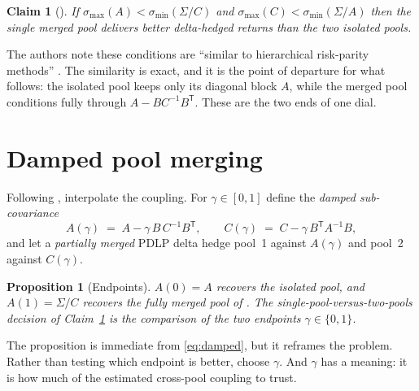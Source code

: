 \documentclass[11pt]{article}
\newtheorem{claim}{Claim}
\newtheorem{proposition}{Proposition}
\theoremstyle{definition}
\newcommand{\Sig}{\Sigma}
\newcommand{\T}{^{\mathsf{T}}}
\newcommand{\smin}{\sigma_{\min}}
\newcommand{\smax}{\sigma_{\max}}
\begin{document}
\begin{claim}[{\citealp[Claim~B.1]{chitra2025}}]
\label{claim:b1}
If $\smax(A) < \smin(\Sig/C)$ and $\smax(C)<\smin(\Sig/A)$ then the single
merged pool delivers better delta-hedged returns than the two isolated pools.
\end{claim}

The authors note these conditions are ``similar to hierarchical risk-parity
methods'' \citep{cotton2024,deprado2016}. The similarity is exact, and it is the
point of departure for what follows: the isolated pool keeps only its diagonal
block $A$, while the merged pool conditions fully through $A - BC^{-1}B\T$. These
are the two ends of one dial.

\section{Damped pool merging}

Following \citet{cotton2024}, interpolate the coupling. For $\gamma\in[0,1]$
define the \emph{damped sub-covariance}
\begin{equation}
\label{eq:damped}
  A(\gamma) \;=\; A - \gamma\, B\,C^{-1}B\T,
  \qquad
  C(\gamma) \;=\; C - \gamma\, B\T A^{-1} B ,
\end{equation}
and let a \emph{partially merged} PDLP delta hedge pool~1 against $A(\gamma)$ and
pool~2 against $C(\gamma)$.

\begin{proposition}[Endpoints]
$A(0)=A$ recovers the isolated pool, and $A(1)=\Sig/C$ recovers the fully merged
pool of \citet{chitra2025}. The single-pool-versus-two-pools decision of
Claim~\ref{claim:b1} is the comparison of the two endpoints $\gamma\in\{0,1\}$.
\end{proposition}

\noindent The proposition is immediate from \eqref{eq:damped}, but it reframes the
problem. Rather than testing which endpoint is better, choose $\gamma$. And
$\gamma$ has a meaning: it is how much of the estimated cross-pool coupling to
trust.
\end{document}
